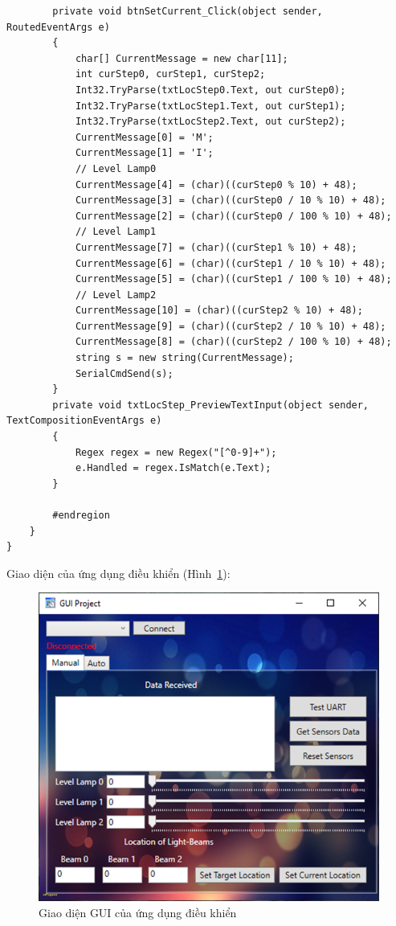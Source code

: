 \begin{lstlisting}
        private void btnSetCurrent_Click(object sender, RoutedEventArgs e)
        {
            char[] CurrentMessage = new char[11];
            int curStep0, curStep1, curStep2;
            Int32.TryParse(txtLocStep0.Text, out curStep0);
            Int32.TryParse(txtLocStep1.Text, out curStep1);
            Int32.TryParse(txtLocStep2.Text, out curStep2);
            CurrentMessage[0] = 'M';
            CurrentMessage[1] = 'I';
            // Level Lamp0
            CurrentMessage[4] = (char)((curStep0 % 10) + 48);
            CurrentMessage[3] = (char)((curStep0 / 10 % 10) + 48);
            CurrentMessage[2] = (char)((curStep0 / 100 % 10) + 48);
            // Level Lamp1
            CurrentMessage[7] = (char)((curStep1 % 10) + 48);
            CurrentMessage[6] = (char)((curStep1 / 10 % 10) + 48);
            CurrentMessage[5] = (char)((curStep1 / 100 % 10) + 48);
            // Level Lamp2
            CurrentMessage[10] = (char)((curStep2 % 10) + 48);
            CurrentMessage[9] = (char)((curStep2 / 10 % 10) + 48);
            CurrentMessage[8] = (char)((curStep2 / 100 % 10) + 48);
            string s = new string(CurrentMessage);
            SerialCmdSend(s);
        }
        private void txtLocStep_PreviewTextInput(object sender, TextCompositionEventArgs e)
        {
            Regex regex = new Regex("[^0-9]+");
            e.Handled = regex.IsMatch(e.Text);
        }

        #endregion
    }
}
\end{lstlisting}

Giao diện của ứng dụng điều khiển (Hình~\ref{fig:C5GUI}):
\begin{figure}[ht]
	\centering
	\includegraphics[scale=0.9]{Chapters/Chapter5/Images/GUI.png}
	\caption{Giao diện GUI của ứng dụng điều khiển}
	\label{fig:C5GUI}
\end{figure}

